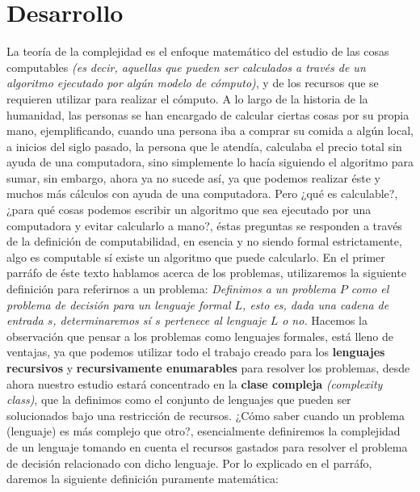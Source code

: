 \documentclass{article}
\begin{document}
\section{Desarrollo}
\noindent
La teoría de la complejidad es el enfoque matemático del estudio de las cosas computables \textit{(es decir, aquellas que 
pueden ser calculados a través de un algoritmo ejecutado por algún modelo de cómputo)}, y de los recursos que se requieren 
utilizar para realizar el cómputo. A lo largo de la historia de la humanidad, las personas se han encargado de calcular 
ciertas cosas por su propia mano, ejemplificando, cuando una persona iba a comprar su comida a algún local, a inicios 
del siglo pasado, la persona que le atendía, calculaba el precio total sin ayuda de una computadora, sino simplemente lo 
hacía siguiendo el algoritmo para sumar, sin embargo, ahora ya no sucede así, ya que podemos realizar éste y muchos 
más cálculos con ayuda de una computadora. Pero ¿qué es calculable?, ¿para qué cosas podemos escribir un algoritmo 
que sea ejecutado por una computadora y evitar calcularlo a mano?, éstas preguntas se responden a través de la 
definición de computabilidad, en esencia y no siendo formal estrictamente, algo es computable sí existe un algoritmo 
que puede calcularlo. 
\newline 
En el primer parráfo de éste texto hablamos acerca de los problemas, utilizaremos la siguiente definición para referirnos 
a un problema:
\newline 
\textit{Definimos a un problema \(P\) como el problema de decisión para un lenguaje formal \(L\), esto es, dada una cadena de entrada 
\(s\), determinaremos sí \(s\) pertenece al lenguaje \(L\) o no.}
\newline 
Hacemos la observación que pensar a los problemas como lenguajes formales, está lleno de ventajas, ya que podemos utilizar 
todo el trabajo creado para los \textbf{lenguajes recursivos} y \textbf{recursivamente enumarables} para resolver los problemas, 
desde ahora nuestro estudio estará concentrado en la \textbf{clase compleja} \textit{(complexity class)}, que la definimos 
como el conjunto de lenguajes que pueden ser solucionados bajo una restricción de recursos.
\newline 
¿Cómo saber cuando un problema (lenguaje) es más complejo que otro?, esencialmente definiremos la complejidad 
de un lenguaje tomando en cuenta el recursos gastados para resolver el problema de decisión relacionado con 
dicho lenguaje. 
\newline 
Por lo explicado en el parráfo, daremos la siguiente definición puramente matemática:
\end{document}
